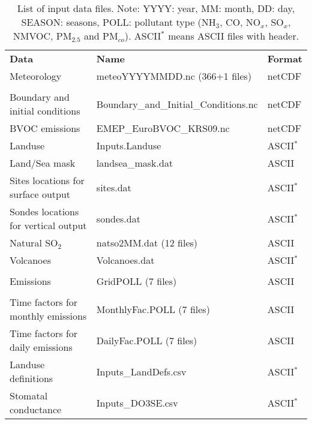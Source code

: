 \begin{table}
\caption[List of input data files]{List of input data files.
Note: YYYY: year, MM: month, DD: day, SEASON: seasons, POLL: pollutant
type (NH$_3$, CO, NO$_x$, SO$_x$, NMVOC,
PM$_{2.5}$ and PM$_{co}$). ASCII$^*$ means ASCII files with header.
\label{Tab:inputdata}}
\begin{small}
\hspace{-1cm}
\begin{tabular}{lll}
 && \\
\hline
{\bf Data} &  {\bf Name} & {\bf Format}\\
\hline\hline
\hline
Meteorology  &  meteoYYYYMMDD.nc \quad (366+1 files) & netCDF\\
& & \\
Boundary and initial conditions & Boundary\_and\_Initial\_Conditions.nc & netCDF\\
BVOC emissions & EMEP\_EuroBVOC\_KRS09.nc & netCDF\\
Landuse & Inputs.Landuse & ASCII$^*$\\
Land/Sea mask & landsea\_mask.dat & ASCII\\
Sites locations for surface output & sites.dat & ASCII$^*$\\
Sondes locations for vertical output & sondes.dat & ASCII$^*$\\
Natural SO$_2$ & natso2MM.dat  \quad (12 files) & ASCII\\
Volcanoes & Volcanoes.dat & ASCII$^*$\\
 && \\
Emissions & GridPOLL  \quad (7 files) & ASCII\\
 && \\
Time factors for monthly emissions& MonthlyFac.POLL  \quad (7 files) & ASCII\\
Time factors for daily emissions &  DailyFac.POLL  \quad (7 files)
& ASCII\\
Landuse definitions & Inputs\_LandDefs.csv & ASCII$^*$\\
Stomatal conductance & Inputs\_DO3SE.csv & ASCII$^*$\\

\end{tabular}
\end{small}
\end{table}
